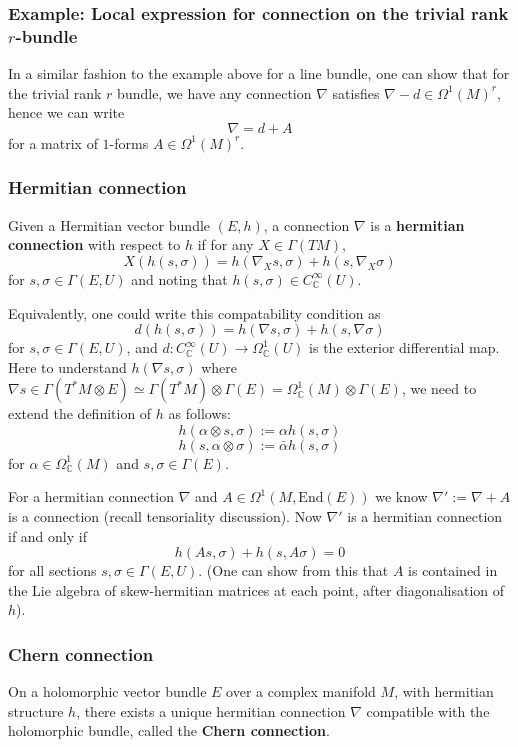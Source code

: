 \documentclass[a4paper]{article}
\theoremstyle{definition} \newtheorem*{definition}{Definition}
\theoremstyle{definition} \newtheorem*{definitions}{Definitions}
\theoremstyle{plain} \newtheorem{theorem}{Theorem}[section]
\theoremstyle{plain} \newtheorem{proposition}[theorem]{Proposition}
\theoremstyle{plain} \newtheorem{corollary}[theorem]{Corollary}
\theoremstyle{plain} \newtheorem{lemma}[theorem]{Lemma}
\theoremstyle{plain} \newtheorem{example}[theorem]{Example}
\newcommand{\defn}[1]{\textbf{#1}}
\newcommand{\complexnos}{\mathbb{C}}
\newcommand{\End}{\text{End}}
\newcommand{\smooth}{C^\infty}
\begin{document}
\subsubsection{Example: Local expression for connection on the trivial rank $r$-bundle}
In a similar fashion to the example above for a line bundle, one can show that for the trivial rank $r$ bundle, we have any connection $\nabla$ satisfies $\nabla - d\in \Omega^1(M)^r$, hence we can write
$$\nabla = d + A$$
for a matrix of $1$-forms $A\in \Omega^1(M)^r$.

\subsubsection{Hermitian connection}
Given a Hermitian vector bundle $(E, h)$, a connection $\nabla$ is a \defn{hermitian connection} with respect to $h$ if for any $X\in \Gamma(TM)$,
$$X(h(s, \sigma))=h(\nabla_X s, \sigma)+h(s,\nabla_X \sigma)$$
for $s, \sigma\in \Gamma(E, U)$ and noting that $h(s, \sigma)\in \smooth_\complexnos (U)$.

Equivalently, one could write this compatability condition as 
$$d(h(s, \sigma))=h(\nabla s, \sigma)+h(s,\nabla\sigma)$$
for $s, \sigma\in \Gamma(E, U)$, and $d:\smooth_\complexnos (U)\to \Omega_\complexnos^1(U)$ is the exterior differential map. Here to understand $h(\nabla s, \sigma)$ where $\nabla s\in \Gamma(T^* M\otimes E)\simeq \Gamma(T^*M)\otimes \Gamma(E)=\Omega^1_\complexnos(M)\otimes \Gamma(E)$, we need to extend the definition of $h$ as follows:
$$h(\alpha \otimes s, \sigma):=\alpha h(s, \sigma)$$
$$h(s, \alpha \otimes \sigma) := \bar{\alpha}h(s, \sigma)$$
for $\alpha \in \Omega_\complexnos^1(M)$ and $s, \sigma\in \Gamma(E)$.

For a hermitian connection $\nabla$ and $A\in \Omega^1(M, \End(E))$ we know $\nabla ' := \nabla + A$ is a connection (recall tensoriality discussion). Now $\nabla'$ is a hermitian connection if and only if
$$h(As, \sigma)+h(s, A\sigma)= 0$$
for all sections $s, \sigma \in \Gamma(E, U)$. (One can show from this that $A$ is contained in the Lie algebra of skew-hermitian matrices at each point, after  diagonalisation of $h$).

\subsubsection{Chern connection}
On a holomorphic vector bundle $E$ over a complex manifold $M$, with hermitian structure $h$, there exists a unique hermitian connection $\nabla$ compatible with the holomorphic bundle, called the \defn{Chern connection}. 
\end{document}
